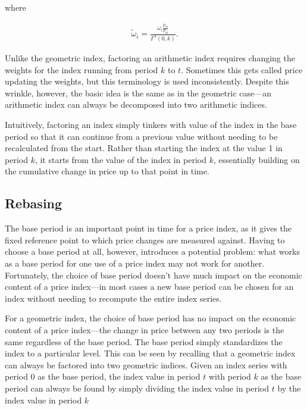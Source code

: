 \documentclass[]{article}
\begin{document}
where

\begin{align*}
\tilde{\omega}_{i} = \frac{\omega_{i} \frac{p_{ik}}{p_{i0}}}{I^{A}(0, k)}. 
\end{align*}

Unlike the geometric index, factoring an arithmetic index requires changing the weights for the index running from period \(k\) to \(t\). Sometimes this gets called price updating the weights, but this terminology is used inconsistently. Despite this wrinkle, however, the basic idea is the same as in the geometric case---an arithmetic index can always be decomposed into two arithmetic indices.

Intuitively, factoring an index simply tinkers with value of the index in the base period so that it can continue from a previous value without needing to be recalculated from the start. Rather than starting the index at the value 1 in period \(k\), it starts from the value of the index in period \(k\), essentially building on the cumulative change in price up to that point in time.

\hypertarget{rebasing}{%
\subsection{Rebasing}\label{rebasing}}

The base period is an important point in time for a price index, as it gives the fixed reference point to which price changes are measured against. Having to choose a base period at all, however, introduces a potential problem: what works as a base period for one use of a price index may not work for another. Fortunately, the choice of base period doesn't have much impact on the economic content of a price index---in most cases a new base period can be chosen for an index without needing to recompute the entire index series.

For a geometric index, the choice of base period has no impact on the economic content of a price index---the change in price between any two periods is the same regardless of the base period. The base period simply standardizes the index to a particular level. This can be seen by recalling that a geometric index can always be factored into two geometric indices. Given an index series with period 0 as the base period, the index value in period \(t\) with period \(k\) as the base period can always be found by simply dividing the index value in period \(t\) by the index value in period \(k\)
\end{document}
